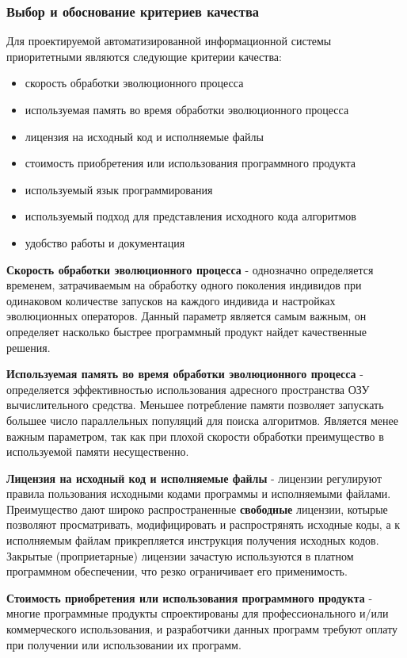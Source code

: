 \documentclass[russian,utf8,emptystyle]{eskdtext}
\begin{document}
\begin{spacing}{1.5}
\subsubsection{Выбор и обоснование критериев качества}
Для проектируемой автоматизированной информационной системы приоритетными являются следующие критерии качества:
\begin{itemize}
\item скорость обработки эволюционного процесса
\item используемая память во время обработки эволюционного процесса
\item лицензия на исходный код и исполняемые файлы
\item стоимость приобретения или использования программного продукта
\item используемый язык программирования
\item используемый подход для представления исходного кода алгоритмов
\item удобство работы и документация
\end{itemize}

\textbf{Скорость обработки эволюционного процесса} - однозначно определяется временем, затрачиваемым на обработку одного поколения индивидов при одинаковом количестве запусков на каждого индивида и настройках эволюционных операторов. Данный параметр является самым важным, он определяет насколько быстрее программный продукт найдет качественные решения.

\textbf{Используемая память во время обработки эволюционного процесса} - определяется эффективностью использования адресного пространства ОЗУ вычислительного средства. Меньшее потребление памяти позволяет запускать большее число параллельных популяций для поиска алгоритмов. Является менее важным параметром, так как при плохой скорости обработки преимущество в используемой памяти несущественно.

\textbf{Лицензия на исходный код и исполняемые файлы} - лицензии регулируют правила пользования исходными кодами программы и исполняемыми файлами. Преимущество дают широко распространенные \textbf{свободные} лицензии, котырые позволяют просматривать, модифицировать и распрострянять исходные коды, а к исполняемым файлам прикрепляется инструкция получения исходных кодов. Закрытые (проприетарные) лицензии зачастую используются в платном программном обеспечении, что резко ограничивает его применимость.

\textbf{Стоимость приобретения или использования программного продукта} - многие программные продукты спроектированы для профессионального и/или коммерческого использования, и разработчики данных программ требуют оплату при получении или использовании их программ.


\end{spacing}
\end{document}
